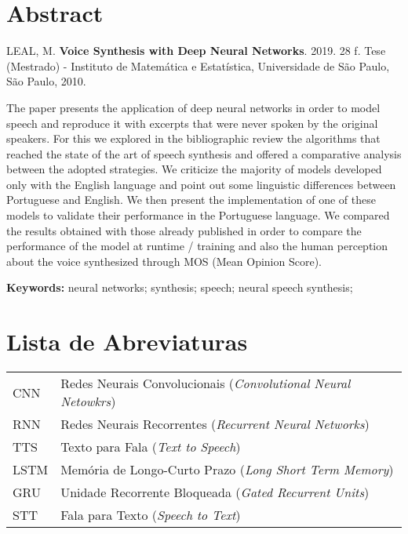 \documentclass[11pt,twoside,a4paper]{book}
\begin{document}
\chapter*{Abstract}
\noindent LEAL, M. \textbf{Voice Synthesis with Deep Neural Networks}. 
2019. 28 f.
Tese (Mestrado) - Instituto de Matemática e Estatística,
Universidade de São Paulo, São Paulo, 2010.
\hfill

The paper presents the application of deep neural networks in order to model speech and reproduce it with excerpts that were never spoken by the original speakers. For this we explored in the bibliographic review the algorithms that reached the state of the art of speech synthesis and offered a comparative analysis between the adopted strategies. We criticize the majority of models developed only with the English language and point out some linguistic differences between Portuguese and English. We then present the implementation of one of these models to validate their performance in the Portuguese language. We compared the results obtained with those already published in order to compare the performance of the model at runtime / training and also the human perception about the voice synthesized through MOS (Mean Opinion Score).

\hfill

\noindent \textbf{Keywords:} neural networks; synthesis; speech; neural speech synthesis;

\tableofcontents    %

\chapter{Lista de Abreviaturas}
\begin{tabular}{ll}
         CNN         & Redes Neurais Convolucionais (\emph{Convolutional Neural Netowkrs})\\
         RNN         & Redes Neurais Recorrentes (\emph{Recurrent Neural Networks})\\
         TTS         & Texto para Fala (\emph{Text to Speech})\\
         LSTM         & Memória de Longo-Curto Prazo (\emph{Long Short Term Memory})\\
         GRU         & Unidade Recorrente Bloqueada  (\emph{Gated Recurrent Units})\\
         STT         & Fala para Texto (\emph{Speech to Text})\\
\end{tabular}
\end{document}
